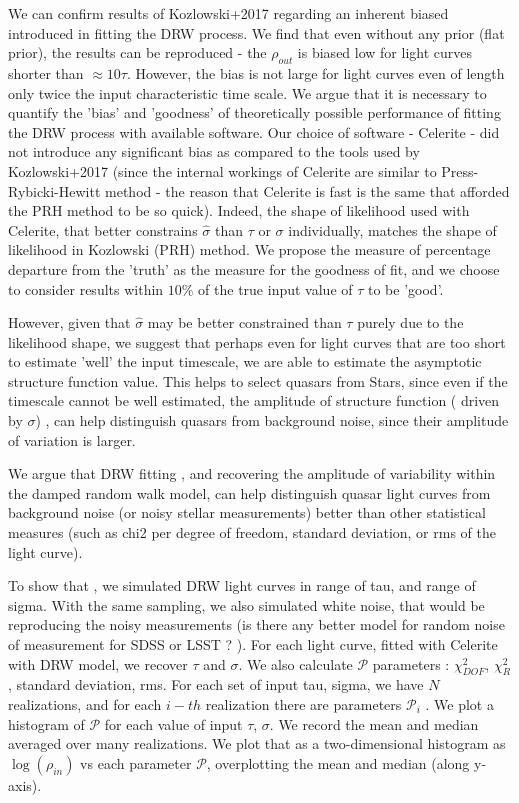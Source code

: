 \documentclass[fleqn,usenatbib]{mnras}  %
\begin{document}
We can confirm results of Kozlowski+2017 regarding an inherent biased introduced in fitting the DRW process. We find that even without any prior (flat prior), the results can be reproduced - the $\rho_{out}$ is biased low for light curves shorter than $\approx 10 \tau$.  However,  the bias is not large for light curves even of length only twice the input characteristic time scale. We argue that it is necessary to quantify the 'bias' and 'goodness' of  theoretically possible performance of  fitting the DRW process with available software. Our choice of software - Celerite - did not introduce any significant bias as compared to the tools used by Kozlowski+2017 (since the internal workings of Celerite are similar to Press-Rybicki-Hewitt method - the reason that Celerite is fast is the same that afforded the PRH method to be so quick). Indeed, the shape of likelihood used with Celerite, that better constrains $\hat{\sigma}$ than $\tau$ or $\sigma$  individually, matches the shape of likelihood in Kozlowski (PRH) method.  We propose the measure of percentage departure from the 'truth' as the measure for the goodness of fit,  and we choose  to consider results within $10 \%$ of the true input value of $\tau$ to be 'good'. 

However,  given that $\hat{\sigma}$ may be better constrained than $\tau$ purely due to the likelihood shape,  we suggest that perhaps even for light curves that are too short to estimate 'well' the input timescale, we are able to estimate the asymptotic structure function value. This helps to select quasars from Stars, since even if the timescale cannot be well estimated,  the amplitude of structure function ( driven by $\sigma$) ,  can help distinguish quasars from background noise, since their amplitude of variation is larger. 

We argue that DRW fitting , and recovering the amplitude of variability within the damped random walk model, can help distinguish  quasar light curves from background noise (or noisy stellar measurements) better than other statistical measures (such as chi2 per degree of freedom, standard deviation,  or rms of the light curve).  

To show that ,  we  simulated  DRW light curves in range of tau, and range of sigma.  With the same sampling, we also simulated white noise, that would be reproducing the  noisy measurements (is there any better model for random noise of measurement  for SDSS  or LSST  ? ). For each light curve, fitted with Celerite with DRW model,  we recover $\tau$ and $\sigma$.  We also calculate $\mathcal{P}$ parameters : $\chi^{2}_{DOF}$, $\chi^{2}_{R}$, standard deviation,  rms.  For each set of input tau, sigma,  we have $N$ realizations, and for each $i-th$ realization there are parameters  $\mathcal{P}_{i}$ . We plot a histogram of $\mathcal{P}$ for each value of input $\tau$, $\sigma$. We record the mean and median averaged over many realizations. We plot that as  a two-dimensional histogram as  $\log{(\rho_{in})}$  vs each parameter $\mathcal{P}$, overplotting the mean and median (along y-axis). 
\end{document}
